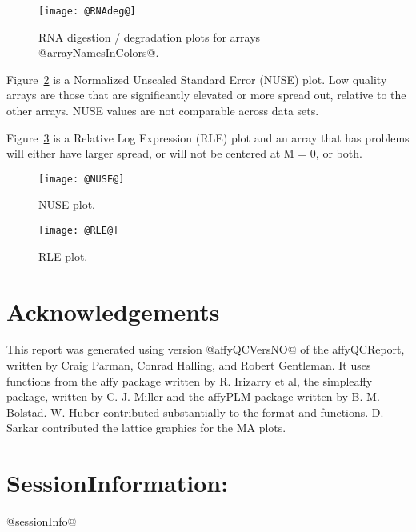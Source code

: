 \documentclass[11pt]{article}
\newcommand{\Rpackage}[1]{{\textsf{#1}}}
\begin{document}
\begin{figure}[tp]
  \centering
\texttt{[image: @RNAdeg@]}
\caption{\label{fig:rnadeg}%
RNA digestion / degradation plots for arrays @arrayNamesInColors@.}
\end{figure}


Figure~\ref{fig:NUSE} is a Normalized Unscaled Standard Error (NUSE) 
plot.  Low quality arrays are those that are significantly elevated or 
more spread out, relative to the other arrays.
NUSE values are not comparable across data sets.

Figure~\ref{fig:RLE} is a Relative Log Expression (RLE) plot
and an array that has problems will either have larger spread, or 
will not be centered at M = 0, or both.

\begin{figure}[tp]
  \centering
\texttt{[image: @NUSE@]}
\caption{\label{fig:NUSE}%
NUSE plot.}
\end{figure}

\begin{figure}[tp]
  \centering
\texttt{[image: @RLE@]}
\caption{\label{fig:RLE}%
RLE plot.}
\end{figure}



\section*{Acknowledgements}
\label{sec:ack}

This report was generated using version @affyQCVersNO@ of the 
\Rpackage{affyQCReport}, written by Craig Parman, Conrad Halling, and
Robert Gentleman. It uses functions from the \Rpackage{affy} package
written by R. Irizarry et al, the \Rpackage{simpleaffy} package, written
by C. J. Miller and the \Rpackage{affyPLM} package written by B. M. Bolstad.
W. Huber contributed substantially to the format and functions.
D. Sarkar contributed the lattice graphics for the MA plots.

\section*{SessionInformation: }
@sessionInfo@
\end{document}
